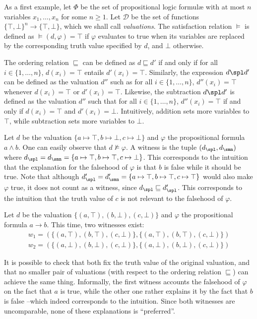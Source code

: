 As a first example, let $\Phi$ be the set of propositional logic formul\ae{} with at most $n$ variables $x_1, \dots, x_n$ for some $n \geq 1$. Let $\mathcal{D}$ be the set of functions $\{\top,\bot\}^n \rightarrow \{\top,\bot\}$, which we shall call \emph{valuations}. The satisfaction relation $\models$ is defined as $\models(d, \varphi) = \top$ if $\varphi$ evaluates to true when its variables are replaced by the corresponding truth value specified by $d$, and $\bot$ otherwise.

The ordering relation $\sqsubseteq$ can be defined as $d \sqsubseteq d'$ if and only if for all $i \in \{1, \dots, n\}$, $d(x_i) = \top$ entails $d'(x_i) = \top$. Similarly, the expression $d \spl d'$ can be defined as the valuation $d''$ such as for all $i \in \{1, \dots, n\}$, $d''(x_i) = \top$ whenever $d(x_i) = \top$ or $d'(x_i) = \top$. Likewise, the subtraction $d \spl d'$ is defined as the valuation $d''$ such that for all $i \in \{1, \dots, n\}$, $d''(x_i) = \top$ if and only if $d(x_i) = \top$ and $d'(x_i) = \bot$. Intuitively, addition sets more variables to $\top$, while subtraction sets more variables to $\bot$.

\begin{example}
Let $d$ be the valuation $\{a \mapsto \top, b \mapsto \bot, c \mapsto \bot\}$ and $\varphi$ the propositional formula $a \wedge b$. One can easily observe that $d \not\models \varphi$. A witness is the tuple $(d_\spl,d_\smn)$ where $d_\spl = d_\smn =  \{a \mapsto \top, b \mapsto \top, c \mapsto \bot\}$. This corresponds to the intuition that the explanation for the falsehood of $\varphi$ is that $b$ is false while it should be true. Note that although $d'_\spl = d'_\smn =  \{a \mapsto \top, b \mapsto \top, c \mapsto \top\}$ would also make $\varphi$ true, it does not count as a witness, since $d_\spl \sqsubseteq d'_\spl$. This corresponds to the intuition that the truth value of $c$ is not relevant to the falsehood of $\varphi$.
\end{example}

\begin{example}
Let $d$ be the valuation $\{(a,\top),(b,\bot),(c,\bot)\}$ and $\varphi$ the propositional formula $a \rightarrow b$. This time, two witnesses exist:
%
\begin{eqnarray*}
& w_1 = (\{(a,\top),(b,\top),(c,\bot)\}, \{(a,\top),(b,\top),(c,\bot)\}) & \\
& w_2 = (\{(a,\bot),(b,\bot),(c,\bot)\}, \{(a,\bot),(b,\bot),(c,\bot)\}) & 
\end{eqnarray*}

It is possible to check that both fix the truth value of the original valuation, and that no smaller pair of valuations (with respect to the ordering relation $\sqsubseteq$) can achieve the same thing. Informally, the first witness accounts the falsehood of $\varphi$ on the fact that $a$ is true, while the other one rather explains it by the fact that $b$ is false --which indeed corresponds to the intuition. Since both witnesses are uncomparable, none of these explanations is ``preferred''.
\end{example}


